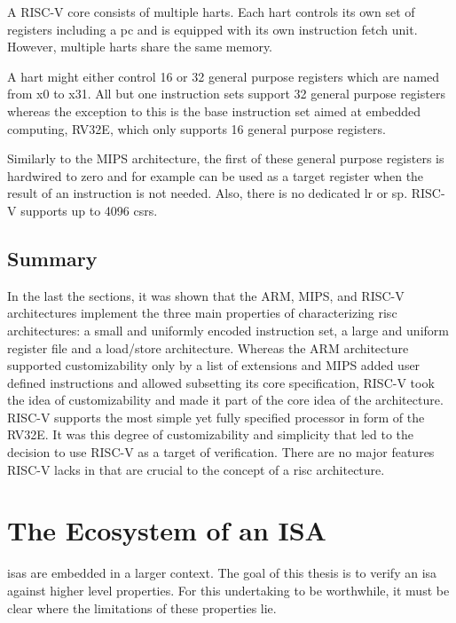 A RISC-V core consists of multiple \glspl{hart}.
Each \gls{hart} controls its own set of registers including a \gls{pc} and is equipped with its own instruction fetch unit.
However, multiple \glspl{hart} share the same memory.

A \gls{hart} might either control 16 or 32 general purpose registers which are named from x0 to x31.
All but one instruction sets support 32 general purpose registers whereas the exception to this is the base instruction set aimed at embedded computing, RV32E, which only supports 16 general purpose registers.

Similarly to the MIPS architecture, the first of these general purpose registers is hardwired to zero and for example can be used as a target register when the result of an instruction is not needed.
Also, there is no dedicated \gls{lr} or \gls{sp}.
RISC-V supports up to 4096 \glspl{csr}.

\subsection{Summary}

In the last the sections, it was shown that the ARM, MIPS, and RISC-V architectures implement the three main properties of \cite{Hennessy12} characterizing \gls{risc} architectures: a small and uniformly encoded instruction set, a large and uniform register file and a load/store architecture.
Whereas the ARM architecture supported customizability only by a list of extensions and MIPS added user defined instructions and allowed subsetting its core specification, RISC-V took the idea of customizability and made it part of the core idea of the architecture.
RISC-V supports the most simple yet fully specified processor in form of the RV32E.
It was this degree of customizability and simplicity that led to the decision to use RISC-V as a target of verification.
There are no major features RISC-V lacks in that are crucial to the concept of a \gls{risc} architecture.

\section{The Ecosystem of an ISA}
\label{sec:ecosystem}

\glspl{isa} are embedded in a larger context.
The goal of this thesis is to verify an \gls{isa} against higher level properties.
For this undertaking to be worthwhile, it must be clear where the limitations of these properties lie.

